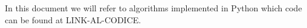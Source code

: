 In this document we will refer to algorithms implemented in Python which code can be found at LINK-AL-CODICE.